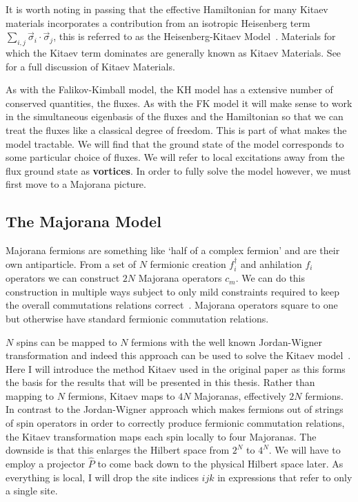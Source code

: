 It is worth noting in passing that the effective Hamiltonian for many Kitaev materials incorporates a contribution from an isotropic Heisenberg term \(\sum_{i,j} \vec{\sigma}_i\cdot\vec{\sigma}_j\), this is referred to as the Heisenberg-Kitaev Model~\autocite{Chaloupka2010}. Materials for which the Kitaev term dominates are generally known as Kitaev Materials. See~\autocite{TrebstPhysRep2022} for a full discussion of Kitaev Materials.

As with the Falikov-Kimball model, the KH model has a extensive number of conserved quantities, the fluxes. As with the FK model it will make sense to work in the simultaneous eigenbasis of the fluxes and the Hamiltonian so that we can treat the fluxes like a classical degree of freedom. This is part of what makes the model tractable. We will find that the ground state of the model corresponds to some particular choice of fluxes. We will refer to local excitations away from the flux ground state as \textbf{vortices}. In order to fully solve the model however, we must first move to a Majorana picture.

\hypertarget{the-majorana-model}{%
\subsection{The Majorana Model}\label{the-majorana-model}}

Majorana fermions are something like `half of a complex fermion' and are their own antiparticle. From a set of \(N\) fermionic creation \(f_i^\dagger\) and anhilation \(f_i\) operators we can construct \(2N\) Majorana operators \(c_m\). We can do this construction in multiple ways subject to only mild constraints required to keep the overall commutations relations correct~\autocite{kitaevAnyonsExactlySolved2006}. Majorana operators square to one but otherwise have standard fermionic commutation relations.

\(N\) spins can be mapped to \(N\) fermions with the well known Jordan-Wigner transformation and indeed this approach can be used to solve the Kitaev model~\autocite{chenExactResultsKitaev2008}. Here I will introduce the method Kitaev used in the original paper as this forms the basis for the results that will be presented in this thesis. Rather than mapping to \(N\) fermions, Kitaev maps to \(4N\) Majoranas, effectively \(2N\) fermions. In contrast to the Jordan-Wigner approach which makes fermions out of strings of spin operators in order to correctly produce fermionic commutation relations, the Kitaev transformation maps each spin locally to four Majoranas. The downside is that this enlarges the Hilbert space from \(2^N\) to \(4^N\). We will have to employ a projector \(\hat{P}\) to come back down to the physical Hilbert space later. As everything is local, I will drop the site indices \(ijk\) in expressions that refer to only a single site.

